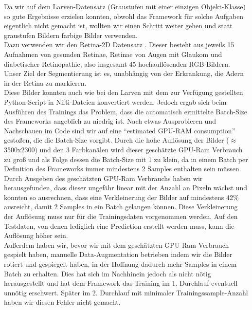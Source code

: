 Da wir auf dem Larven-Datensatz \cite{larven} (Graustufen mit einer einzigen Objekt-Klasse) so gute Ergebnisse erzielen konnten, obwohl das Framework für solche Aufgaben eigentlich nicht gemacht ist, wollten wir einen Schritt weiter gehen und statt graustufen Bildern farbige Bilder verwenden.\\
Dazu verwenden wir den Retina-2D Datensatz \cite{retina2d}. Dieser besteht aus jeweils 15 Aufnahmen von gesunden Retinae, Retinae von Augen mit Glaukom und diabetischer Retinopathie, also insgesamt 45 hochauflösenden RGB-Bildern. Unser Ziel der Segmentierung ist es, unabhängig von der Erkrankung, die Adern in der Retina zu markieren.\\
Diese Bilder konnten auch wie bei den Larven mit dem zur Verfügung gestellten Python-Script \cite{nnunetGithub2D-Pythonscript} in Nifti-Dateien konvertiert werden. Jedoch ergab sich beim Ausführen des Trainings das Problem, dass die automatisch ermittelte Batch-Size des Frameworks angeblich zu niedrig ist. Nach etwas Ausprobieren und Nachschauen im Code sind wir auf eine \enquote{estimated GPU-RAM consumption} \cite{nnunetGithub} gestoßen, die die Batch-Size vorgibt. Durch die hohe Auflösung der Bilder ($\approx$ 3500x2300) und den 3 Farbkanälen wird dieser geschätzte GPU-Ram Verbrauch zu groß und als Folge dessen die Batch-Size mit 1 zu klein, da in einem Batch per Definition des Frameworks immer mindestens 2 Samples enthalten sein müssen.\\
Durch Ausgeben des geschätzten GPU-Ram Verbrauchs haben wir herausgefunden, dass dieser ungefähr linear mit der Anzahl an Pixeln wächst und konnten so ausrechnen, dass eine Verkleinerung der Bilder auf mindestens 42\% ausreicht, damit 2 Samples in ein Batch gelangen können.
Diese Verkleinerung der Auflösung muss nur für die Trainingsdaten vorgenommen werden. Auf den Testdaten, von denen lediglich eine Prediction erstellt werden muss, kann die Auflösung höher sein.\\
Außerdem haben wir, bevor wir mit dem geschätzten GPU-Ram Verbrauch gespielt haben, manuelle Data-Augmentation betrieben indem wir die Bilder rotiert und gespiegelt haben, in der Hoffnung dadurch mehr Samples in einem Batch zu erhalten. Dies hat sich im Nachhinein jedoch als nicht nötig herausgestellt und hat dem Framework das Training im 1. Durchlauf eventuell unnötig erschwert. Später im 2. Durchlauf mit minimaler Trainingssample-Anzahl haben wir diesen Fehler nicht gemacht.


